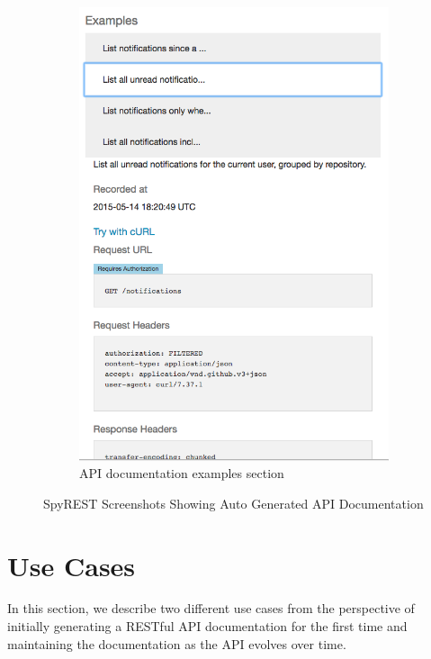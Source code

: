 \begin{figure}[!tbh]
\begin{mdframed}
\begin{subfigure}[t]{0.5\textwidth}
      \includegraphics[width=\linewidth]{examples.png}
      \caption{API documentation examples section}
      \label{fig:examples}
    \end{subfigure}
    \caption{SpyREST Screenshots Showing Auto Generated API Documentation}
    \label{fig:spyrest_screenshots}
  \end{mdframed}
\end{figure}

\section{Use Cases}
In this section, we describe two different use cases from the perspective of initially generating a RESTful API documentation for the first time and  maintaining the documentation as the API evolves over time.

